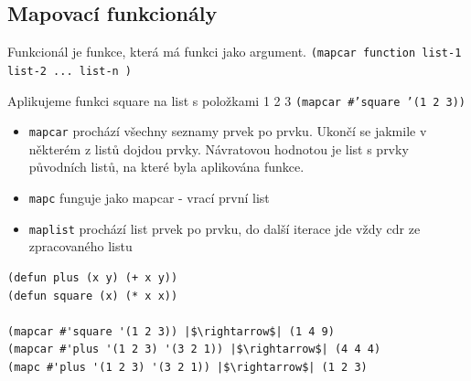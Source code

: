 \documentclass{szzclass}
\begin{document}
\subsection{Mapovací funkcionály}
Funkcionál je funkce, která má funkci jako argument.
  \texttt{(mapcar function list-1 list-2 ... list-n )}

Aplikujeme funkci square na list s položkami 1 2 3
  \texttt{(mapcar #'square '(1 2 3))}

\begin{itemize}
\item \texttt{mapcar} prochází všechny seznamy prvek po prvku. Ukončí se jakmile v některém z listů dojdou prvky. Návratovou hodnotou je list s prvky původních listů, na které byla aplikována funkce.
\item \texttt{mapc} funguje jako mapcar - vrací první list
\item \texttt{maplist} prochází list prvek po prvku, do další iterace jde vždy cdr ze zpracovaného listu
\end{itemize}

\begin{verbatim}
(defun plus (x y) (+ x y))
(defun square (x) (* x x))

(mapcar #'square '(1 2 3)) |$\rightarrow$| (1 4 9)
(mapcar #'plus '(1 2 3) '(3 2 1)) |$\rightarrow$| (4 4 4)
(mapc #'plus '(1 2 3) '(3 2 1)) |$\rightarrow$| (1 2 3)
\end{verbatim}
\end{document}
